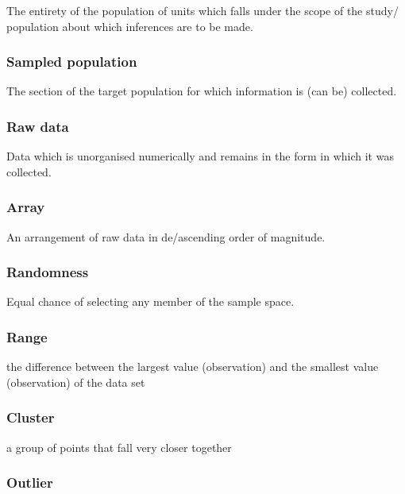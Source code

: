 \documentclass[]{article}
\begin{document}
The entirety of the population of units which falls under the scope of
the study/ population about which inferences are to be made.

\hypertarget{sampled-population}{%
\subsubsection{Sampled population}\label{sampled-population}}

The section of the target population for which information is (can be)
collected.

\hypertarget{raw-data}{%
\subsubsection{Raw data}\label{raw-data}}

Data which is unorganised numerically and remains in the form in which
it was collected.

\hypertarget{array}{%
\subsubsection{Array}\label{array}}

An arrangement of raw data in de/ascending order of magnitude.

\hypertarget{randomness}{%
\subsubsection{Randomness}\label{randomness}}

Equal chance of selecting any member of the sample space.

\hypertarget{range}{%
\subsubsection{Range}\label{range}}

the difference between the largest value (observation) and the smallest
value (observation) of the data set

\hypertarget{cluster}{%
\subsubsection{Cluster}\label{cluster}}

a group of points that fall very closer together

\hypertarget{outlier}{%
\subsubsection{Outlier}\label{outlier}}
\end{document}
